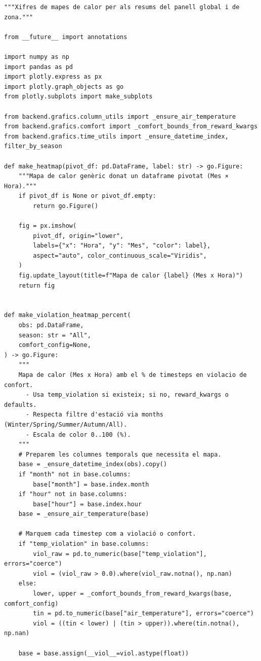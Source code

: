 \documentclass[10pt,a4paper]{article}
\begin{document}
\begin{lstlisting}[style=studioPython,caption={backend/grafics/heatmaps.py},label={lst:backend-grafics-heatmaps-py}]
"""Xifres de mapes de calor per als resums del panell global i de zona."""

from __future__ import annotations

import numpy as np
import pandas as pd
import plotly.express as px
import plotly.graph_objects as go
from plotly.subplots import make_subplots

from backend.grafics.column_utils import _ensure_air_temperature
from backend.grafics.comfort import _comfort_bounds_from_reward_kwargs
from backend.grafics.time_utils import _ensure_datetime_index, filter_by_season

def make_heatmap(pivot_df: pd.DataFrame, label: str) -> go.Figure:
    """Mapa de calor genèric donat un dataframe pivotat (Mes × Hora)."""
    if pivot_df is None or pivot_df.empty:
        return go.Figure()

    fig = px.imshow(
        pivot_df, origin="lower",
        labels={"x": "Hora", "y": "Mes", "color": label},
        aspect="auto", color_continuous_scale="Viridis",
    )
    fig.update_layout(title=f"Mapa de calor {label} (Mes x Hora)")
    return fig


def make_violation_heatmap_percent(
    obs: pd.DataFrame,
    season: str = "All",
    comfort_config=None,
) -> go.Figure:
    """
    Mapa de calor (Mes x Hora) amb el % de timesteps en violacio de confort.
      - Usa temp_violation si existeix; si no, reward_kwargs o defaults.
      - Respecta filtre d'estació via months (Winter/Spring/Summer/Autumn/All).
      - Escala de color 0..100 (%).
    """
    # Preparem les columnes temporals que necessita el mapa.
    base = _ensure_datetime_index(obs).copy()
    if "month" not in base.columns:
        base["month"] = base.index.month
    if "hour" not in base.columns:
        base["hour"] = base.index.hour
    base = _ensure_air_temperature(base)

    # Marquem cada timestep com a violació o confort.
    if "temp_violation" in base.columns:
        viol_raw = pd.to_numeric(base["temp_violation"], errors="coerce")
        viol = (viol_raw > 0.0).where(viol_raw.notna(), np.nan)
    else:
        lower, upper = _comfort_bounds_from_reward_kwargs(base, comfort_config)
        tin = pd.to_numeric(base["air_temperature"], errors="coerce")
        viol = ((tin < lower) | (tin > upper)).where(tin.notna(), np.nan)

    base = base.assign(__viol__=viol.astype(float))


\end{lstlisting}
\end{document}
